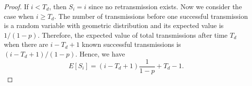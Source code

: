 \begin{proof}
    If $i<T_d$, then $S_i = i$ since no retransmission exists.
    Now we consider the case when $i \geq T_d$.
    The number of transmissions before one successful transmission
    is a random variable with geometric distribution and its
    expected value is $1/(1-p)$.  Therefore, the expected value of
    total transmissions after time $T_d$ when there are
    $i - T_d + 1$ known successful transmissions is $(i - T_d +1)/(1-p)$.
    Hence, we have 
    \begin{displaymath}
        E[S_i]          = (i - T_d + 1)\frac{1}{1-p} + T_d - 1.
    \end{displaymath}

\end{proof}
